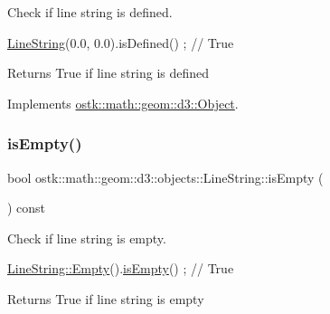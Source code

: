 Check if line string is defined. 


\begin{DoxyCode}
\hyperlink{classostk_1_1math_1_1geom_1_1d3_1_1objects_1_1_line_string_a711ebaa7353366ba729bf1ed648fd5a4}{LineString}(0.0, 0.0).isDefined() ; \textcolor{comment}{// True}
\end{DoxyCode}


\begin{DoxyReturn}{Returns}
True if line string is defined 
\end{DoxyReturn}


Implements \hyperlink{classostk_1_1math_1_1geom_1_1d3_1_1_object_a271a1964cd208be85ce9a0a429395ad8}{ostk\+::math\+::geom\+::d3\+::\+Object}.

\mbox{\label{classostk_1_1math_1_1geom_1_1d3_1_1objects_1_1_line_string_a9d80b820c5d81d7f68c831c593f665a1}} 
\subsubsection{\texorpdfstring{is\+Empty()}{isEmpty()}}
{\footnotesize\ttfamily bool ostk\+::math\+::geom\+::d3\+::objects\+::\+Line\+String\+::is\+Empty (\begin{DoxyParamCaption}{ }\end{DoxyParamCaption}) const}



Check if line string is empty. 


\begin{DoxyCode}
\hyperlink{classostk_1_1math_1_1geom_1_1d3_1_1objects_1_1_line_string_a6b5c3b32f1f029f0948bc4f9f1dacf3b}{LineString::Empty}().\hyperlink{classostk_1_1math_1_1geom_1_1d3_1_1objects_1_1_line_string_a9d80b820c5d81d7f68c831c593f665a1}{isEmpty}() ; \textcolor{comment}{// True}
\end{DoxyCode}


\begin{DoxyReturn}{Returns}
True if line string is empty 
\end{DoxyReturn}
\mbox{\label{classostk_1_1math_1_1geom_1_1d3_1_1objects_1_1_line_string_a6947cb8217dcb49d2e0698c83226a1cc}} 
